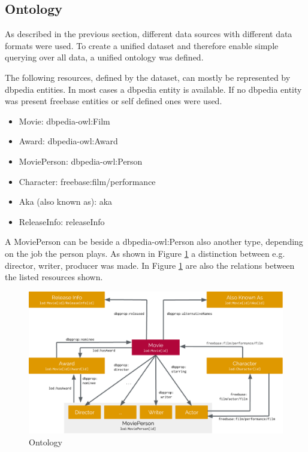 \subsection{Ontology}
\label{subsec_method_ontology}

As described in the previous section, different data sources with different data formats were used. 
To create a unified dataset and therefore enable simple querying over all data, a unified ontology was defined.


The following resources, defined by the dataset, can mostly be represented by dbpedia entities. 
In most cases a dbpedia entity is available.
If no dbpedia entity was present freebase entities or self defined ones were used.

\begin{itemize}
\item Movie: dbpedia-owl:Film
\item Award: dbpedia-owl:Award
\item MoviePerson: dbpedia-owl:Person
\item Character: freebase:film/performance
\item Aka (also known as): aka
\item ReleaseInfo: releaseInfo

\end{itemize}

A MoviePerson can be beside a dbpedia-owl:Person also another type, depending on the job the person plays. 
As shown in Figure \ref{fig_ontology} a distinction between e.g. director, writer, producer was made.
In Figure \ref{fig_ontology} are also the relations between the listed resources shown.



\begin{figure}[h!]
\includegraphics[width=\textwidth]{images/ontology.pdf}
\caption{Ontology}
\label{fig_ontology}
\end{figure}

